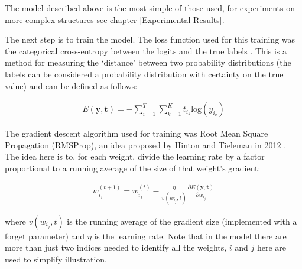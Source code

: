 \documentclass[bsc,singlespacing,logo, parskip, deptreport]{infthesis}
\begin{document}
\begin{center}
\end{center}

The model described above is the most simple of those used, for experiments on more complex structures see chapter \ref{Experimental Results}.

The next step is to train the model. The loss function used for this training was the categorical cross-entropy between the logits and the true labels \cite{shore1980axiomatic}. This is a method for measuring the `distance' between two probability distributions (the labels can be considered a probability distribution with certainty on the true value) and can be defined as follows:

\begin{align}
  E(\bm{y}, \bm{t}) = - \sum_{i=1}^{T}\sum_{k=1}^{K} t_{i_k} \mathrm{log}(y_{i_k})
\end{align}

The gradient descent algorithm used for training was Root Mean Square Propagation (RMSProp), an idea proposed by Hinton and Tieleman in 2012 \cite{tieleman2012lecture}. The idea here is to, for each weight, divide the learning rate by a factor proportional to a running average of the size of that weight's gradient:

\begin{align}
  w_{i_j}^{(t+1)} = w_{i_j}^{(t)} - \frac{\eta}{v(w_{i_j}, t)} \frac{\partial E(\bm{y}, \bm{t})}{\partial w_{i_j}}
\end{align}

where $v(w_{i_j}, t)$ is the running average of the gradient size (implemented with a forget parameter) and $\eta$ is the learning rate. Note that in the model there are more than just two indices needed to identify all the weights, $i$ and $j$ here are used to simplify illustration.
\end{document}
